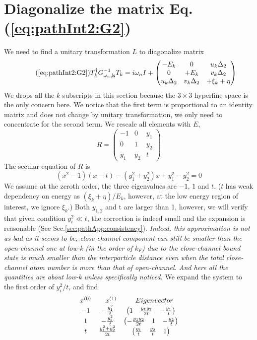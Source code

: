 

\section{Diagonalize the matrix Eq. (\ref{eq:pathInt2:G2})\label{sec:diagonalize}}
We need to find a unitary transformation $L$ to diagonalize matrix 
\begin{equation}\tag{\ref{eq:pathInt2:G2}}
T_k^{\dg}G_{\omega_{n},\vk}^{-1}T_k=i\omega_nI+\mtrx{-E_k&0&u_k\Delta_2\\0&+E_k&v_k\Delta_2\\u_k\Delta_2&v_k\Delta_2&+\xi_k+\eta}
\end{equation}
We drops all the $k$ subscripts in this section because the $3\times3$ hyperfine space is the only concern here.  We notice that the first term is proportional to an identity matrix and does not change by unitary transformation, we only need to concentrate for the second term.  We rescale all elements with $E$, 
\begin{equation*}
R=
\begin{pmatrix}
-1&0&y_1\\
0&1&y_2\\
y_1&y_2&t
\end{pmatrix}
\end{equation*}
The secular equation of $R$ is 
\begin{equation}\label{eq:pahtApp:secular}
(x^{2}-1)(x-t)-(y_{1}^{2}+y_{2}^{2})x+y_{1}^{2}-y_{2}^{2}=0
\end{equation}
We  assume at the zeroth order, the three eigenvalues are $-1$, $1$ and $t$.  ($t$ has weak dependency on energy as $(\xi_{k}+\eta)/E_{k}$, however, at the low energy region of interest, we ignore $\xi_{k}$.) Both $y_{1,2}$ and t are larger than 1, however, we will verify that given condition $y_{i}^{2}\ll{t}$, the correction is indeed small and the expansion is reasonable (See Sec.\ref{sec:pathApp:consistency}).  \emph{Indeed, this approximation is not as bad as it seems to be, close-channel component can still be smaller than the open-channel one at low-k (in the order of $k_{F}$)  due to the close-channel bound state is much smaller than the interparticle distance even when the total close-channel atom number  is more than that of open-channel.  And here all the quantities are about low-k unless specifically noticed.} 
We expand the system to the first order of $y_{i}^{2}/{t}$, and find
\begin{equation}
\begin{array}{ccc}
x^{(0)}&\quad{}x^{(1)}&\quad{}Eigenvector\nonumber\\
-1&-\frac{y_{1}^{2}}{t}&\begin{pmatrix}1&\frac{y_{1}y_{2}}{2t}&-\frac{y_{1}}{t}\end{pmatrix}\\
1&-\frac{y_{2}^{2}}{t}&\begin{pmatrix}-\frac{y_{1}y_{2}}{2t}&1&-\frac{y_{2}}{t}\end{pmatrix}\\
t&\frac{y_{1}^{2}+y_{2}^{2}}{2t}&\begin{pmatrix}\frac{y_{1}}{t}&\frac{y_{2}}{t}&1\end{pmatrix}
\end{array}
\end{equation}
